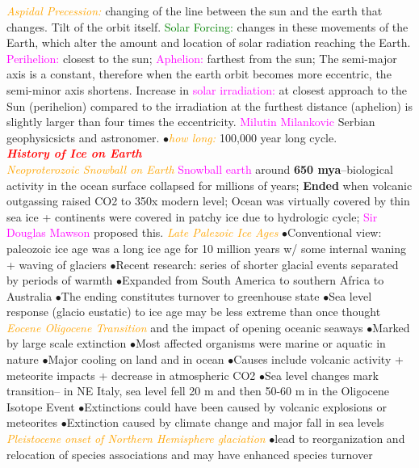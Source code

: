 \documentclass{article}
\newcommand{\ddd}{$\bullet$}
\newcommand{\red}[1]{\textcolor{red}{#1}}
\newcommand{\green}[1]{\textcolor{green}{#1}}
\newcommand{\pink}[1]{\textcolor{magenta}{#1}}
\newcommand{\orange}[1]{\textcolor{orange}{#1}}
\newcommand{\mysection}[1]{\\ \textbf{\textit{\red{#1}}} \\}
\newcommand{\mysub}[1]{{\textit{\orange{#1}}}}
\newcommand{\mysubsub}[1]{{{\green{#1}}}}
\newcommand{\vocab}[1]{{\pink{#1}}}
\begin{document}
\begin{multicols*}{4}
        \mysub{Aspidal Precession: }changing of the line between the sun and the earth that changes. Tilt of the orbit itself. 
        \mysubsub{Solar Forcing: }changes in these movements of the Earth, which alter the amount and location of solar radiation reaching the Earth.
        \vocab{Perihelion: }closest to the sun; \vocab{Aphelion: }farthest from the sun; The semi-major axis is a constant, therefore when the earth orbit becomes more eccentric, the semi-minor axis shortens. Increase in \vocab{solar irradiation: }at closest approach to the Sun (perihelion) compared to the irradiation at the furthest distance (aphelion) is slightly larger than four times the eccentricity.
        \vocab{Milutin Milankovic} Serbian geophysicsicts and astronomer.
        \ddd \mysub{how long: }100,000 year long cycle. 
    \mysection{History of Ice on Earth}
        \mysub{Neoproterozoic Snowball on Earth} 
            \vocab{Snowball earth} around \textbf{650 mya}--biological activity in the ocean surface collapsed for millions of years; \textbf{Ended} when volcanic outgassing raised CO2 to 350x modern level; Ocean was virtually covered by thin sea ice + continents were covered in patchy ice due to hydrologic cycle; \vocab{Sir Douglas Mawson} proposed this. 
        \mysub{Late Palezoic Ice Ages}
            \ddd Conventional view: paleozoic ice age was a long ice age for 10 million years w/ some internal waning + waving of glaciers
            \ddd Recent research: series of shorter glacial events separated by periods of warmth
            \ddd Expanded from South America to southern Africa to Australia 
            \ddd The ending constitutes turnover to greenhouse state
            \ddd Sea level response (glacio eustatic) to ice age may be less extreme than once thought
        \mysub{Eocene Oligocene Transition} and the impact of opening oceanic seaways
            \ddd Marked by large scale extinction
            \ddd Most affected organisms were marine or aquatic in nature
            \ddd Major cooling on land and in ocean
            \ddd Causes include volcanic activity + meteorite impacts + decrease in atmospheric CO2
            \ddd Sea level changes mark transition-- in NE Italy, sea level fell 20 m and then 50-60 m in the Oligocene Isotope Event
            \ddd Extinctions could have been caused by volcanic explosions or meteorites
            \ddd Extinction caused by climate change and major fall in sea levels
        \mysub{Pleistocene onset of Northern Hemisphere glaciation}
            \ddd lead to reorganization and relocation of species associations and may have enhanced species turnover

\end{multicols*}
\end{document}
